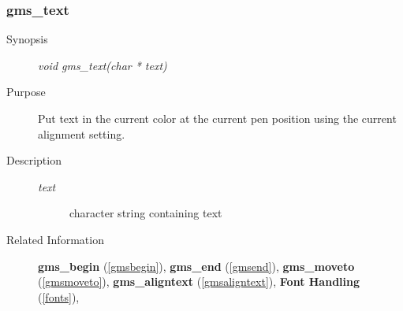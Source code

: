 \newpage



\subsubsection{gms\_text\label{gmstext}}
\begin{description}
\item[Synopsis]\mbox{}


{\em void    gms\_text(char * text)\/}
\item[Purpose]\mbox{}


Put text in the  current color at the current pen position using the current
alignment setting. 
\item[Description]\mbox{}


\begin{description}
\item[{\em text\/}]\mbox{}

 character string containing text
\end{description}

\item[Related Information]\mbox{}


{\bf gms\_begin} (\ref{gmsbegin}), 
{\bf gms\_end} (\ref{gmsend}), 
{\bf gms\_moveto} (\ref{gmsmoveto}), 
{\bf gms\_aligntext} (\ref{gmsaligntext}), 
{\bf Font Handling} (\ref{fonts}), 
\end{description}






